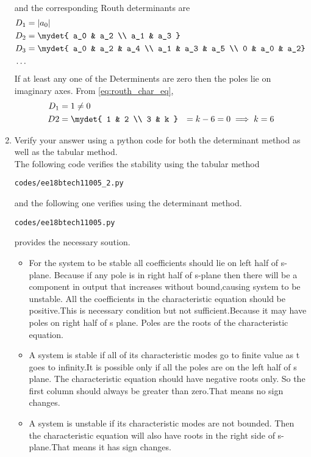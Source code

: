 \begin{enumerate}[label=\thesubsection.\arabic*.,ref=\thesubsection.\theenumi]
\begin{align}
\end{align}
and the corresponding Routh determinants are
\begin{align}
D_1 &= |a_0|
\\
D_2 &= 
\mydet{
a_0 & a_2 
\\ 
a_1 & a_3
} 
\\
D_3 &=\mydet{
a_0 & a_2 & a_4 
\\ a_1 & a_3 & a_5 
\\ 0 & a_0 & a_2}
\\
\dots
\end{align}
If at least any one of the Determinents are zero then the poles lie on imaginary axes.  From \eqref{eq:routh_char_eq},
%
\begin{align}
D_1 &= 1 \ne 0
\\
D2 &= \mydet{
1 & 2 \\ 3 & k } 
&= k-6 =0 \implies k = 6
\end{align}
%
\item Verify your answer using a python code for both the determinant method as well as the tabular method.
\label{prob:ee18btech11005_python}
\\
\solution 
The following code verifies the stability using the tabular method 
%
\begin{lstlisting}
codes/ee18btech11005_2.py
\end{lstlisting}
and the following one verifies using the determinant method.
\begin{lstlisting}
codes/ee18btech11005.py
\end{lstlisting}
%
provides the necessary soution.
\begin{itemize}
\item  For the system to be stable all coefficients should lie on left half of s-plane. Because if any pole is in right half of s-plane then there will be a component in output that increases without bound,causing system to be unstable.
All the coefficients in the characteristic equation should be positive.This is necessary condition but not sufficient.Because it may have poles on right half of s plane.
Poles are the roots of the characteristic equation.
    \item A system is stable if all of its characteristic modes go to finite value as t goes to infinity.It is possible only if all the poles are on the left half of s plane.
    The characteristic equation should have negative roots only. So the first column should always be greater than zero.That means no sign changes.
    \item A system is unstable if its characteristic modes are not bounded. Then the characteristic equation will also have roots in the right side of s-plane.That means it has sign changes.
    \end{itemize}


\end{enumerate}
